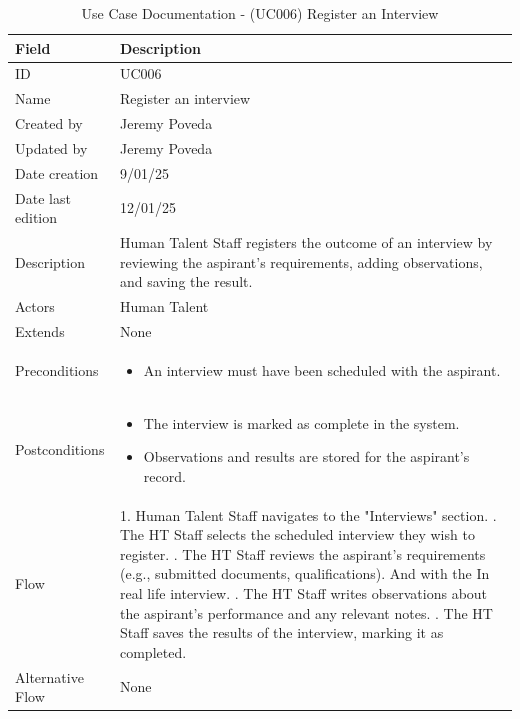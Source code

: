 \documentclass{scrreprt}
\begin{document}
\begin{table}[H]
	\centering
	\begin{tabular}{|p{3cm}|p{10cm}|}
		\hline
		\textbf{Field} & \textbf{Description} \\ \hline
		ID & UC006 \\ \hline
		Name & Register an interview \\ \hline
		Created by & Jeremy Poveda \\ \hline
		Updated by & Jeremy Poveda \\ \hline
		Date creation & 9/01/25 \\ \hline
		Date last edition & 12/01/25 \\ \hline
		Description & Human Talent Staff registers the outcome of an interview by reviewing the aspirant's requirements, adding observations, and saving the result. \\ \hline
		Actors & Human Talent \\ \hline
		Extends & None \\ \hline
		Preconditions & 
		\begin{itemize}
			\item An interview must have been scheduled with the aspirant.
		\end{itemize} \\ \hline
		Postconditions & 
		\begin{itemize}
			\item The interview is marked as complete in the system.
			\item Observations and results are stored for the aspirant's record.
		\end{itemize} \\ \hline
		Flow & 
		1. Human Talent Staff navigates to the "Interviews" section. \newline
		2. The HT Staff selects the scheduled interview they wish to register. \newline
		3. The HT Staff reviews the aspirant's requirements (e.g., submitted documents, qualifications). And with the In real life interview. \newline
		4. The HT Staff writes observations about the aspirant's performance and any relevant notes. \newline
		5. The HT Staff saves the results of the interview, marking it as completed. \\ \hline
		Alternative Flow & 
		None \\ \hline
	\end{tabular}
	\caption{Use Case Documentation - (UC006) Register an Interview}
	\label{table:UC006}
\end{table}
\end{document}
